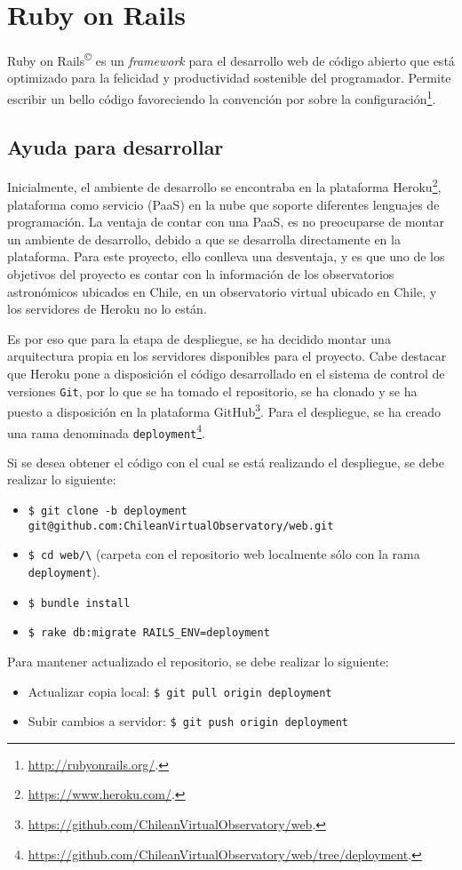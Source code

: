 \section{Ruby on Rails}\label{anx:ror}

Ruby on Rails\textsuperscript{\copyright{}} es un \emph{framework} para el desarrollo web de código abierto que está optimizado para la felicidad y productividad sostenible del programador. Permite escribir un bello código favoreciendo la convención por sobre la configuración\footnote{\url{http://rubyonrails.org/}.}.

\subsection*{Ayuda para desarrollar}

Inicialmente, el ambiente de desarrollo se encontraba en la plataforma Heroku\footnote{\url{https://www.heroku.com/}.}, plataforma como servicio (PaaS) en la nube que soporte diferentes lenguajes de programación. La ventaja de contar con una PaaS, es no preocuparse de montar un ambiente de desarrollo, debido a que se desarrolla directamente en la plataforma. Para este proyecto, ello conlleva una desventaja, y es que uno de los objetivos del proyecto es contar con la información de los observatorios astronómicos ubicados en Chile, en un observatorio virtual ubicado en Chile, y los servidores de Heroku no lo están.

Es por eso que para la etapa de despliegue, se ha decidido montar una arquitectura propia en los servidores disponibles para el proyecto. Cabe destacar que Heroku pone a disposición el código desarrollado en el sistema de control de versiones \verb;Git;, por lo que se ha tomado el repositorio, se ha clonado y se ha puesto a disposición en la plataforma GitHub\footnote{\url{https://github.com/ChileanVirtualObservatory/web}.}. Para el despliegue, se ha creado una rama denominada \verb;deployment;\footnote{\url{https://github.com/ChileanVirtualObservatory/web/tree/deployment}.}.

Si se desea obtener el código con el cual se está realizando el despliegue, se debe realizar lo siguiente:

\begin{itemize}
	\item \verb;$ git clone -b deployment git@github.com:ChileanVirtualObservatory/web.git;
	\item \verb;$ cd web/\; (carpeta con el repositorio web localmente sólo con la rama \verb;deployment;).
	\item \verb;$ bundle install;
	\item \verb;$ rake db:migrate RAILS_ENV=deployment;
\end{itemize}

Para mantener actualizado el repositorio, se debe realizar lo siguiente:

\begin{itemize}
	\item Actualizar copia local: \verb;$ git pull origin deployment;
	\item Subir cambios a servidor: \verb;$ git push origin deployment;
\end{itemize}
